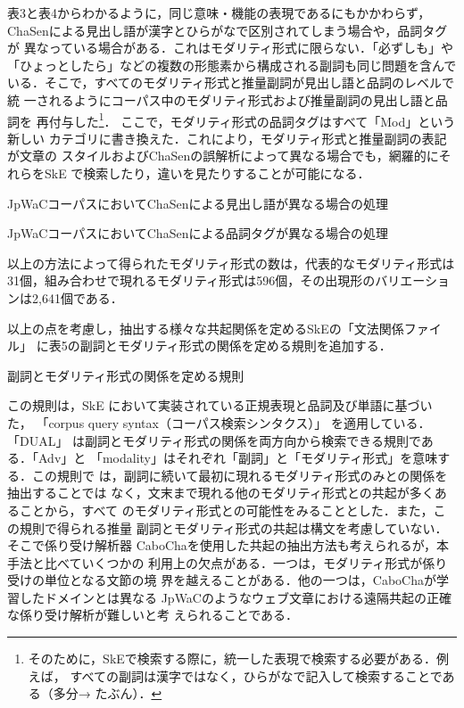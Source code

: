 \documentclass[japanese]{jnlp_1.4}
\begin{document}
表3と表4からわかるように，同じ意味・機能の表現であるにもかかわらず，
ChaSenによる見出し語が漢字とひらがなで区別されてしまう場合や，品詞タグが
異なっている場合がある．これはモダリティ形式に限らない．「必ずしも」や
「ひょっとしたら」などの複数の形態素から構成される副詞も同じ問題を含んで
いる．そこで，すべてのモダリティ形式と推量副詞が見出し語と品詞のレベルで統
一されるようにコーパス中のモダリティ形式および推量副詞の見出し語と品詞を
再付与した\footnote{
	そのために，SkEで検索する際に，統一した表現で検索する必要がある．例えば，
	すべての副詞は漢字ではなく，ひらがなで記入して検索することである（多分→
	たぶん）．}．
ここで，モダリティ形式の品詞タグはすべて「Mod」という新しい
カテゴリに書き換えた．これにより，モダリティ形式と推量副詞の表記が文章の
スタイルおよびChaSenの誤解析によって異なる場合でも，網羅的にそれらをSkE
で検索したり，違いを見たりすることが可能になる．

\begin{table}[t]
\caption{JpWaCコーパスにおいてChaSenによる見出し語が異なる場合の処理}

\end{table}
\begin{table}[t]
\caption{JpWaCコーパスにおいてChaSenによる品詞タグが異なる場合の処理}

\end{table}

以上の方法によって得られたモダリティ形式の数は，代表的なモダリティ形式は
31個，組み合わせで現れるモダリティ形式は596個，その出現形のバリエーショ
ンは2,641個である．

以上の点を考慮し，抽出する様々な共起関係を定めるSkEの「文法関係ファイル」
に表5の副詞とモダリティ形式の関係を定める規則を追加する．

\begin{table}[t]
\caption{副詞とモダリティ形式の関係を定める規則}

\end{table}

この規則は，SkE において実装されている正規表現と品詞及び単語に基づいた，
「corpus query syntax（コーパス検索シンタクス）」 を適用している．「DUAL」
は副詞とモダリティ形式の関係を両方向から検索できる規則である．「Adv」と
「modality」はそれぞれ「副詞」と「モダリティ形式」を意味する．この規則で
は，副詞に続いて最初に現れるモダリティ形式のみとの関係を抽出することでは
なく，文末まで現れる他のモダリティ形式との共起が多くあることから，すべて
のモダリティ形式との可能性をみることとした．また，この規則で得られる推量
副詞とモダリティ形式の共起は構文を考慮していない．そこで係り受け解析器
CaboChaを使用した共起の抽出方法も考えられるが，本手法と比べていくつかの
利用上の欠点がある．一つは，モダリティ形式が係り受けの単位となる文節の境
界を越えることがある．他の一つは，CaboChaが学習したドメインとは異なる
JpWaCのようなウェブ文章における遠隔共起の正確な係り受け解析が難しいと考
えられることである．
\end{document}
